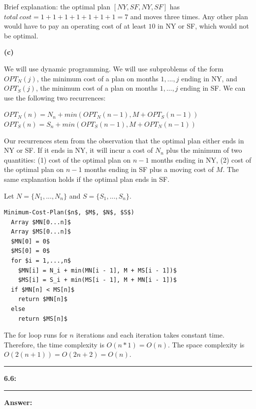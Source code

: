 \documentclass[11pt]{article}
\newcommand\question[2]{\vspace{.25in}\hrule\textbf{#1: #2}\vspace{.5em}\hrule\vspace{.10in}}
\renewcommand\part[1]{\vspace{.10in}\textbf{(#1)}}
\newcommand\answer{\vspace{.10in}\textbf{Answer: }}
\begin{document}
Brief explanation: the optimal plan $[NY, SF, NY, SF]$ has $total\:cost = 1 + 1 + 1 + 1 + 1 + 1 + 1 = 7$ and moves three times. Any other plan would have to pay an operating cost of at least $10$ in NY or SF, which would not be optimal.

\clearpage

\part{c}

We will use dynamic programming. We will use subproblems of the form $OPT_N(j)$, the minimum cost of a plan on months $1,...,j$ ending in NY, and $OPT_S(j)$, the minimum cost of a plan on months $1,...,j$ ending in SF. We can use the following two recurrences:\newline

$OPT_N(n) = N_n + min(OPT_N(n - 1), M + OPT_S(n - 1))$\\
$OPT_S(n) = S_n + min(OPT_S(n - 1), M + OPT_N(n - 1))$\newline

Our recurrences stem from the observation that the optimal plan either ends in NY or SF. If it ends in NY, it will incur a cost of $N_n$ plus the minimum of two quantities: (1) cost of the optimal plan on $n - 1$ months ending in NY, (2) cost of the optimal plan on $n - 1$ months ending in SF plus a moving cost of $M$. The same explanation holds if the optimal plan ends in SF.

Let $N = \{N_1,...,N_n\}$ and $S = \{S_1,...,S_n\}$.

\begin{lstlisting}
Minimum-Cost-Plan($n$, $M$, $N$, $S$)
  Array $MN[0...n]$
  Array $MS[0...n]$
  $MN[0] = 0$
  $MS[0] = 0$
  for $i = 1,...,n$
    $MN[i] = N_i + min(MN[i - 1], M + MS[i - 1])$
    $MS[i] = S_i + min(MS[i - 1], M + MN[i - 1])$
  if $MN[n] < MS[n]$
    return $MN[n]$
  else
    return $MS[n]$
\end{lstlisting}

The for loop runs for $n$ iterations and each iteration takes constant time. Therefore, the time complexity is $O(n * 1) = O(n)$. The space complexity is $O(2(n + 1)) = O(2n + 2) = O(n)$.

\clearpage

\question{6.6}{}

\answer
\end{document}
